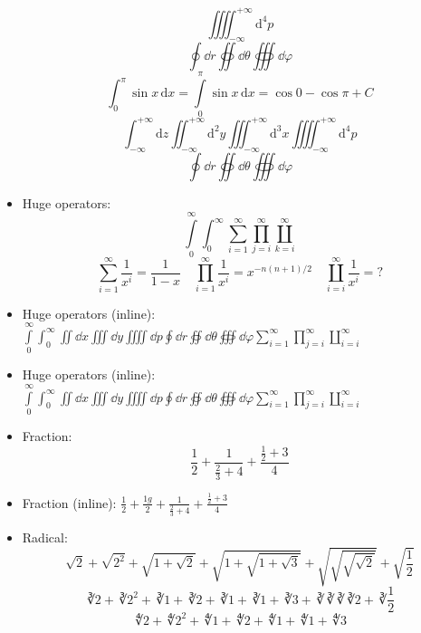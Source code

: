 \documentclass { article }
\begin{document}
\begin{itemize}
\[          \iiiint_{-\infty}^{+\infty} \mathrm{d}^4 p
        \]
        \[ \oint \dd{r} \oiint \dd{\theta} \oiiint \dd{\varphi}\]
        \begingroup
          \[
              \int_0^\pi        \sin x \, \mathrm{d} x
            = \int\limits_0^\pi \sin x \, \mathrm{d} x
            = \cos 0 - \cos\pi + C
          \]
          \[
            \int_{-\infty}^{+\infty}    \mathrm{d} z
            \iint_{-\infty}^{+\infty}   \mathrm{d}^2 y
            \iiint_{-\infty}^{+\infty}  \mathrm{d}^3 x
            \iiiint_{-\infty}^{+\infty} \mathrm{d}^4 p
          \]
          \[ \oint \dd{r} \oiint \dd{\theta} \oiiint \dd{\varphi} \]
        \endgroup
  \item Huge operators:
        \[
          \int\limits_0^\infty \int_0^\infty
          \sum_{i=1}^\infty \prod_{j=i}^\infty \coprod_{k=i}^\infty
        \]
        \[
          \sum_{i=1}^\infty    \frac{1}{x^i} = \frac{1}{1-x} \quad
          \prod_{i=1}^\infty   \frac{1}{x^i} = x^{-n(n+1)/2} \quad
          \coprod_{i=i}^\infty \frac{1}{x^i} = ?
        \]
  \item Huge operators (inline):
        $ \int\limits_0^\infty \int_0^\infty \iint \dd{x} \iiint \dd{y} \iiiint \dd{p}
          \oint \dd{r} \oiint \dd{\theta} \oiiint \dd{\varphi}
          \sum_{i=1}^\infty \prod_{j=i}^\infty \coprod_{i=i}^\infty $
  \item Huge operators (inline):
        \begingroup
          $ \int\limits_0^\infty \int_0^\infty \iint \dd{x} \iiint \dd{y} \iiiint \dd{p}
            \oint \dd{r} \oiint \dd{\theta} \oiiint \dd{\varphi}
            \sum_{i=1}^\infty \prod_{j=i}^\infty \coprod_{i=i}^\infty $
        \endgroup
  \item Fraction:
        \[ \frac{1}{2} + \frac{1}{\frac{2}{3}+4} + \frac{\frac{1}{2}+3}{4} \]
  \item Fraction (inline):
        $ \frac{1}{2} + \frac{1g}{2} + \frac{1}{\frac{2}{3}+4} + \frac{\frac{1}{2}+3}{4} $
  \item Radical:
        \[
            \sqrt{2} + \sqrt{2^2} + \sqrt{1+\sqrt{2}} + \sqrt{1+\sqrt{1+\sqrt{3}}}
          + \sqrt{\sqrt{\sqrt{\sqrt{2}}}} + \sqrt{\frac{1}{2}}
        \]
        \[
            \cuberoot{2} + \cuberoot{2^2} + \cuberoot{1+\cuberoot{2}}
          + \cuberoot{1+\cuberoot{1+\cuberoot{3}}}
          + \cuberoot{\cuberoot{\cuberoot{\cuberoot{2}}}} + \cuberoot{\frac{1}{2}}
        \]
        \[
            \fourthroot{2} + \fourthroot{2^2} + \fourthroot{1+\fourthroot{2}}
          + \fourthroot{1+\fourthroot{1+\fourthroot{3}}}
\]
\end{itemize}
\end{document}
